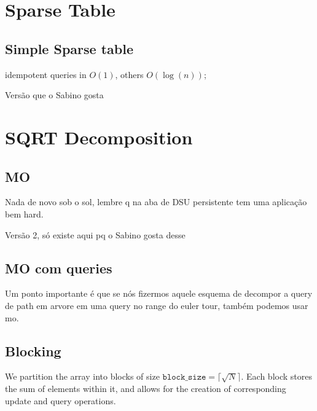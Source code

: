     
    \section{Sparse Table}
    
    \subsection{Simple Sparse table}
    idempotent queries in $O(1)$, others $O(\log (n))$;
    
    Versão que o Sabino gosta
    
    \section{SQRT Decomposition}
        \subsection{MO}
        Nada de novo sob o sol, lembre q na aba de DSU persistente tem uma aplicação bem hard.
         
         Versão 2, só existe aqui pq o Sabino gosta desse
         
        \subsection{MO com queries}
         
         Um ponto importante é que se nós fizermos aquele esquema de decompor a query de path em arvore em uma query no range do euler tour, também podemos usar mo.
        \subsection{Blocking}
        We partition the array into blocks of size $\texttt{block\_size}=\lceil \sqrt{N} \rceil$. Each block stores the sum of elements within it, and allows for the
        creation of corresponding update and query operations.
        
